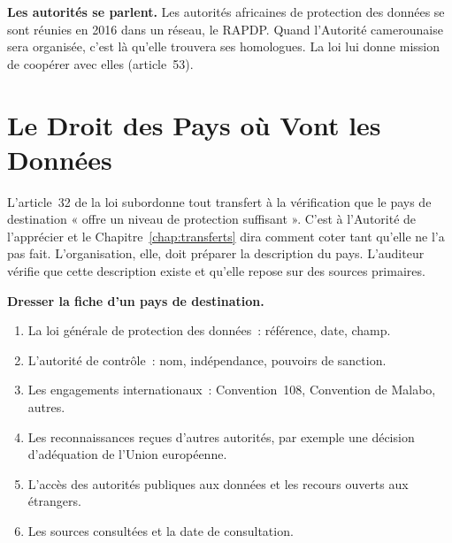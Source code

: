 \begin{boxinfo}
\textbf{Les autorités se parlent.} Les autorités africaines de protection
des données se sont réunies en 2016 dans un réseau, le RAPDP. Quand
l'Autorité camerounaise sera organisée, c'est là qu'elle trouvera ses
homologues. La loi lui donne mission de coopérer avec elles (article~53).
\end{boxinfo}

\section{Le Droit des Pays où Vont les Données}
\label{sec:c03-pays}

L'article~32 de la loi subordonne tout transfert à la vérification que le
pays de destination « offre un niveau de protection suffisant ». C'est à
l'Autorité de l'apprécier et le Chapitre~\ref{chap:transferts} dira comment
coter tant qu'elle ne l'a pas fait. L'organisation, elle, doit préparer la
description du pays. L'auditeur vérifie que cette description existe et
qu'elle repose sur des sources primaires.

\begin{boxprocedure}
\textbf{Dresser la fiche d'un pays de destination.}
\begin{enumerate}
    \item La loi générale de protection des données~: référence, date, champ.
    \item L'autorité de contrôle~: nom, indépendance, pouvoirs de sanction.
    \item Les engagements internationaux~: Convention~108, Convention de
          Malabo, autres.
    \item Les reconnaissances reçues d'autres autorités, par exemple une
          décision d'adéquation de l'Union européenne.
    \item L'accès des autorités publiques aux données et les recours ouverts
          aux étrangers.
    \item Les sources consultées et la date de consultation.
\end{enumerate}
\end{boxprocedure}


